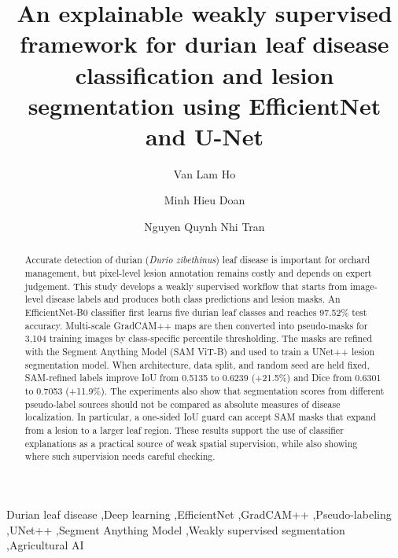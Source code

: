 \documentclass[final,5p,times,twocolumn,authoryear]{elsarticle}
\begin{document}
\begin{frontmatter}


\title{An explainable weakly supervised framework for durian leaf disease classification and lesion segmentation using EfficientNet and U-Net}

\author[aff1]{Van Lam Ho}
\author[aff2]{Minh Hieu Doan}
\author[aff3]{Nguyen Quynh Nhi Tran}





\begin{abstract}
Accurate detection of durian (\textit{Durio zibethinus}) leaf disease is important for orchard management, but pixel-level lesion annotation remains costly and depends on expert judgement. This study develops a weakly supervised workflow that starts from image-level disease labels and produces both class predictions and lesion masks. An EfficientNet-B0 classifier first learns five durian leaf classes and reaches 97.52\% test accuracy. Multi-scale GradCAM++ maps are then converted into pseudo-masks for 3{,}104 training images by class-specific percentile thresholding. The masks are refined with the Segment Anything Model (SAM ViT-B) and used to train a UNet++ lesion segmentation model. When architecture, data split, and random seed are held fixed, SAM-refined labels improve IoU from 0.5135 to 0.6239 (+21.5\%) and Dice from 0.6301 to 0.7053 (+11.9\%). The experiments also show that segmentation scores from different pseudo-label sources should not be compared as absolute measures of disease localization. In particular, a one-sided IoU guard can accept SAM masks that expand from a lesion to a larger leaf region. These results support the use of classifier explanations as a practical source of weak spatial supervision, while also showing where such supervision needs careful checking.
\end{abstract}

\begin{keyword}
Durian leaf disease \sep Deep learning \sep EfficientNet \sep GradCAM++ \sep Pseudo-labeling \sep UNet++ \sep Segment Anything Model \sep Weakly supervised segmentation \sep Agricultural AI
\end{keyword}

\end{frontmatter}
\end{document}
